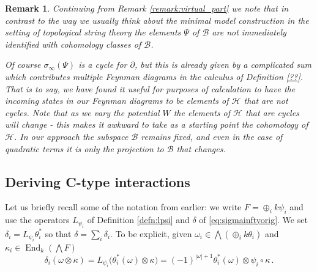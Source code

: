 \documentclass[english,letter paper,12pt,leqno]{article}
\theoremstyle{example}
\newtheorem{remark}[theorem]{Remark}
\numberwithin{equation}{section}
\DeclareMathOperator{\End}{End}
\begin{document}
\begin{remark}\label{remark:virt_part_2} Continuing from Remark \ref{remark:virtual_part} we note that in contrast to the way we usually think about the minimal model construction in the setting of topological string theory \cite{??} the elements $\Psi$ of $\mathscr{B}$ are not immediately identified with cohomology classes of $\mathscr{B}$. 

Of course $\sigma_\infty(\Psi)$ is a cycle for $\partial$, but this is already given by a complicated sum which contributes multiple Feynman diagrams in the calculus of Definition \ref{??}. That is to say, we have found it useful for purposes of calculation to have the incoming states in our Feynman diagrams to be elements of $\mathscr{H}$ that are \emph{not} cycles. Note that as we vary the potential $W$ the elements of $\mathscr{H}$ that are cycles will change - this makes it awkward to take as a starting point the cohomology of $\mathscr{H}$. In our approach the subspace $\mathscr{B}$ remains fixed, and even in the case of quadratic terms it is only the projection to $\mathscr{B}$ that changes.
\end{remark}

\subsection{Deriving C-type interactions}

Let us briefly recall some of the notation from earlier: we write $F = \oplus_i k \psi_i$ and use the operators $L_{\psi_i}$ of Definition \ref{defn:lpsi} and $\delta$ of \eqref{eq:sigmainftyorig}. We set $\delta_i = L_{\psi_i} \theta_i^*$ so that $\delta = \sum_i \delta_i$. To be explicit, given $\omega_i \in \bigwedge( \oplus_i k \theta_i )$ and $\kappa_i \in \End_k(\bigwedge F)$
\[
\delta_i( \omega \otimes \kappa ) = L_{\psi_i}\big( \theta_i^*( \omega ) \otimes \kappa ) = (-1)^{|\omega| + 1} \theta_i^*(\omega) \otimes \psi_i \circ \kappa\,.
\]
\end{document}
